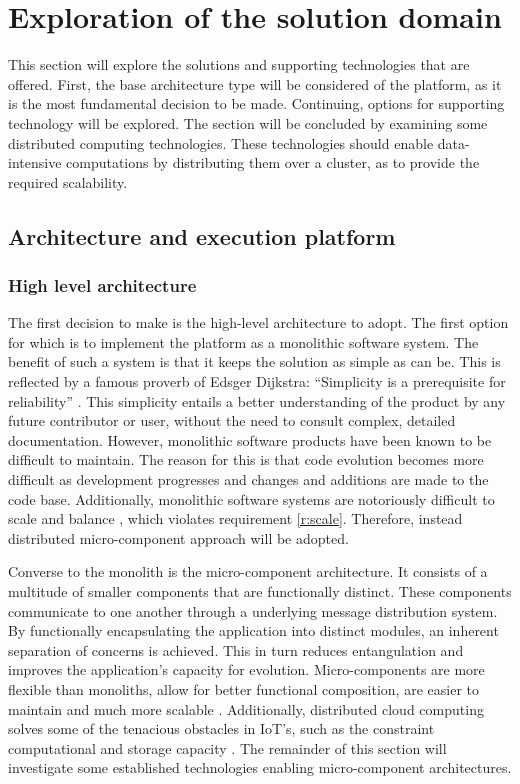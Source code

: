 \section{Exploration of the solution domain}
This section will explore the solutions and supporting technologies that are offered. First, the  base architecture type will be considered of the platform, as it is the most fundamental decision to be made. Continuing, options for supporting technology will be explored. The section will be concluded by examining some distributed computing technologies. These technologies should enable data-intensive computations by distributing them over a cluster, as to provide the required scalability.
\subsection{Architecture and execution platform}
\subsubsection*{High level architecture}
The first decision to make is the high-level architecture to adopt. The first option for which is to implement the platform as a monolithic software system. The benefit of such a system is that it keeps the solution as simple as can be. This is reflected by a famous proverb of Edsger Dijkstra: ``Simplicity is a prerequisite for reliability'' \cite{dijkstra}. This simplicity entails a better understanding of the product by any future contributor or user, without the need to consult complex, detailed documentation. However, monolithic software products have been known to be difficult to maintain. The reason for this is that code evolution becomes more difficult as development progresses and changes and additions are made to the code base. Additionally, monolithic software systems are notoriously difficult to scale and balance \cite{mono_vs_micro}, which violates requirement \ref{r:scale}. Therefore, instead distributed micro-component approach will be adopted.

Converse to the monolith is the micro-component architecture. It consists of a multitude of smaller components that are functionally distinct. These components communicate to one another through a underlying message distribution system. By functionally encapsulating the application into distinct modules, an inherent separation of concerns is achieved. This in turn reduces entangulation and improves the application's capacity for evolution. Micro-components are  more flexible than monoliths, allow for better functional composition, are easier to maintain and much more scalable \cite{mono_vs_micro}. Additionally, distributed cloud computing solves some of the tenacious obstacles in IoT's, such as the constraint computational and storage capacity \cite{benefits_cloud_to_iot}. The remainder of this section will investigate some established technologies enabling micro-component architectures.


